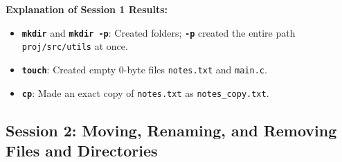 \documentclass[10pt,a4paper]{article}
\newcommand{\cmd}[1]{\texttt{\textbf{#1}}}
\begin{document}
\vspace{2pt}\noindent\textbf{Explanation of Session 1 Results:}\par\vspace{1pt}
\begin{itemize}[noitemsep,topsep=1pt,leftmargin=1.2em]
  \item \cmd{mkdir} and \cmd{mkdir -p}: Created folders; \cmd{-p} created the entire path \texttt{proj/src/utils} at once.
  \item \cmd{touch}: Created empty 0-byte files \texttt{notes.txt} and \texttt{main.c}.
  \item \cmd{cp}: Made an exact copy of \texttt{notes.txt} as \texttt{notes\_copy.txt}.
\end{itemize}

\subsection{Session 2: Moving, Renaming, and Removing Files and Directories}
\end{document}
